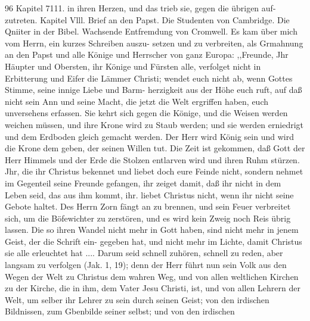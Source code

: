 96 Kapitel 7111.
in ihren Herzen, und das trieb sie, gegen die übrigen auf-
zutreten.
Kapitel Vlll.
Brief an den Papst. Die Studenten von Cambridge. Die Qniiter
in der Bibel. Wachsende Entfremdung von Cromwell.
Es kam über mich vom Herrn, ein kurzes Schreiben auszu-
setzen und zu verbreiten, als Grmahnung an den Papst und alle
Könige und Herrscher von ganz Europa:
,,Freunde,
Jhr Häupter und Obersten, ihr Könige und Fürsten alle,
verfolget nicht in Erbitterung und Eifer die Lämmer Christi; wendet
euch nicht ab, wenn Gottes Stimme, seine innige Liebe und Barm-
herzigkeit aus der Höhe euch ruft, auf daß nicht sein Ann und
seine Macht, die jetzt die Welt ergriffen haben, euch unversehens
erfassen. Sie kehrt sich gegen die Könige, und die Weisen werden
weichen müssen, und ihre Krone wird zu Staub werden; und sie
werden erniedrigt und dem Erdboden gleich gemacht werden. Der
Herr wird König sein und wird die Krone dem geben, der seinen
Willen tut. Die Zeit ist gekommen, daß Gott der Herr Himmels
und der Erde die Stolzen entlarven wird und ihren Ruhm stürzen.
Jhr, die ihr Christus bekennet und liebet doch eure Feinde nicht,
sondern nehmet im Gegenteil seine Freunde gefangen, ihr zeiget
damit, daß ihr nicht in dem Leben seid, das aus ihm kommt, ihr.
liebet Christus nicht, wenn ihr nicht seine Gebote haltet. Des
Herrn Zorn fängt an zu brennen, und sein Feuer verbreitet
sich, um die Böfewichter zu zerstören, und es wird kein Zweig
noch Reis übrig lassen. Die so ihren Wandel nicht mehr in
Gott haben, sind nicht mehr in jenem Geist, der die Schrift ein-
gegeben hat, und nicht mehr im Lichte, damit Christus sie alle
erleuchtet hat .... Darum seid schnell zuhören, schnell zu reden,
aber langsam zu verfolgen (Jak. 1, 19); denn der Herr führt nun
sein Volk aus den Wegen der Welt zu Christus dem wahren
Weg, und von allen weltlichen Kirchen zu der Kirche, die in ihm,
dem Vater Jesu Christi, ist, und von allen Lehrern der Welt,
um selber ihr Lehrer zu sein durch seinen Geist; von den irdischen
Bildnissen, zum Gbenbilde seiner selbst; und von den irdischen


